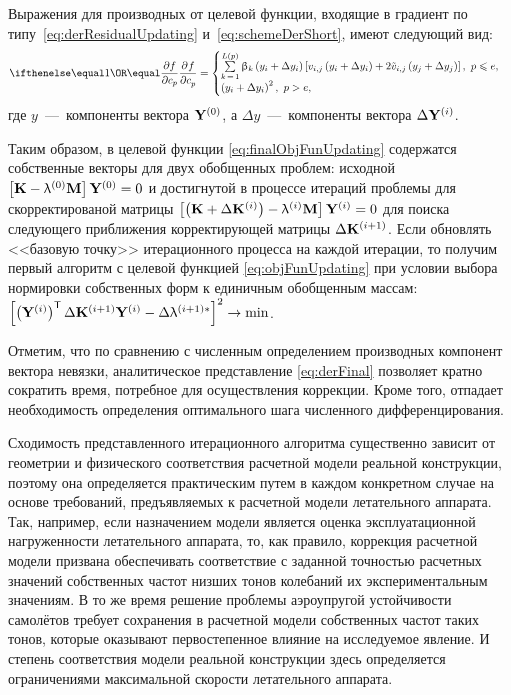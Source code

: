 Выражения для производных от целевой функции, входящие в градиент по типу~\eqref{eq:derResidualUpdating} и~\eqref{eq:schemeDerShort}, имеют следующий вид:
\begin{equation}
	\partDer{f}{c_p}{} = 
	\begin{cases}
		\sum\limits_{k\,=\,1} ^ {L(p)} \beta_k \rbrackets{y_i + \Delta y_i} \sbrackets{v_{i, j} \rbrackets{y_i + \Delta y_i} + 2 \tilde{v}_{i, j} \rbrackets{y_j + \Delta y_j}}, \ p \leq e, \\
		\rbrackets{y_i + \Delta y_i} ^ 2, \ p > e,
	\end{cases} \label{eq:derFinal}
\end{equation}
где $ y $~---~компоненты вектора $ \mathbf{Y} ^ {(0)} $, а $ \Delta y $~---~компоненты вектора $ \Delta \mathbf{Y} ^ {(i)} $.

Таким образом, в целевой функции \eqref{eq:finalObjFunUpdating} содержатся собственные векторы для двух обобщенных проблем: исходной $ \left[ \mathbf{K} - \uplambda ^ {(0)} \mathbf{M} \right] \mathbf{Y} ^ {(0)} = 0 $ и достигнутой в процессе итераций проблемы для скорректированой матрицы $ \left[ \left( \mathbf{K} + \Delta \mathbf{K} ^ {(i)} \right) - \uplambda ^ {(i)} \mathbf{M} \right] \mathbf{Y} ^ {(i)} = 0 $ для поиска следующего приближения корректирующей матрицы $ \Delta \mathbf{K} ^ {(i + 1)} $. Если обновлять <<базовую точку>> итерационного процесса на каждой итерации, то получим первый алгоритм с целевой функцией \eqref{eq:objFunUpdating} при условии выбора нормировки собственных форм к единичным обобщенным массам: $ \left[ \left( \mathbf{Y} ^ {(i)} \right) ^ \mathsf{T} \Delta \mathbf{K} ^ {(i + 1)} \mathbf{Y} ^ {(i)} - \Delta \uplambda ^ {(i + 1) \ast} \right] ^ 2 \rightarrow \min $.

Отметим, что по сравнению с численным определением производных компонент вектора невязки, аналитическое представление \eqref{eq:derFinal} позволяет кратно сократить время, потребное для осуществления коррекции. Кроме того, отпадает необходимость определения оптимального шага численного дифференцирования.

Сходимость представленного итерационного алгоритма существенно зависит от геометрии и физического соответствия расчетной модели реальной конструкции, поэтому она определяется практическим путем в каждом конкретном случае на основе требований, предъявляемых к расчетной модели летательного аппарата. Так, например, если назначением модели является оценка эксплуатационной нагруженности летательного аппарата, то, как правило, коррекция расчетной модели призвана обеспечивать соответствие с заданной точностью расчетных значений собственных частот низших тонов колебаний их экспериментальным значениям. В то же время решение проблемы аэроупругой устойчивости самолётов требует сохранения в расчетной модели собственных частот таких тонов, которые оказывают первостепенное влияние на исследуемое явление. И степень соответствия модели реальной конструкции здесь определяется ограничениями максимальной скорости летательного аппарата.

